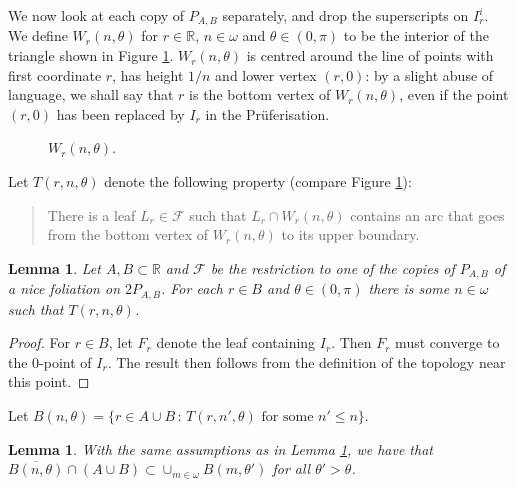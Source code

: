 \documentclass{amsart}
\newtheorem{lemma}[theorem]{Lemma}
\begin{document}
We now look at each copy of $P_{A,B}$ separately, and drop the superscripts on $I^i_r$. We define $W_r(n,\theta)$ for $r\in{\mathbb R}$, $n\in\omega$ and $\theta\in (0,\pi)$ to be the interior of the triangle shown in Figure \ref{figure4}. $W_r(n,\theta)$ is centred around the line of points with first coordinate $r$, has height $1/n$ and lower vertex $(r,0)$: by a slight abuse of language, we shall say that $r$ is the bottom vertex of $W_r(n,\theta)$, even if the point $(r,0)$ has been replaced by $I_r$ in the Pr\"uferisation.

\begin{figure}[h]
\centering
    \caption{\label{figure4} $W_r(n,\theta)$.}
\end{figure}

Let $T(r,n,\theta)$ denote the following property (compare Figure \ref{figure4}): 
\begin{quote} There is a leaf $L_r\in\mathcal{F}$ such that $L_r\cap W_r(n,\theta)$ contains an arc that goes from the bottom vertex of $W_r(n,\theta)$ to its upper boundary.
\end{quote}

\begin{lemma}\label{31bis3}
Let $A,B\subset{\mathbb R}$ and $\mathcal{F}$ be the restriction to one of the copies of $P_{A,B}$ of a nice foliation on $2P_{A,B}$. For each $r\in B$ and $\theta\in(0,\pi)$ there is some $n\in\omega$ such that $T(r,n,\theta)$.
\end{lemma}

\begin{proof}
For $r\in B$, let $F_r$ denote the leaf containing $I_r$. Then $F_r$ must converge to the $0$-point of $I_r$. The result then follows from the definition of the topology near this point.
\end{proof}

Let $B(n,\theta)=\{r\in A\cup B\,:\,T(r,n',\theta)\text{ for some }n'\le n\}$.

\begin{lemma}\label{31bis4}
With the same assumptions as in Lemma \ref{31bis3}, we have that ${\overline{{B(n,\theta)}}}\cap (A\cup B)\subset \cup_{m\in\omega}B(m,\theta')$ for all $\theta' > \theta$.
\end{lemma}
\end{document}
